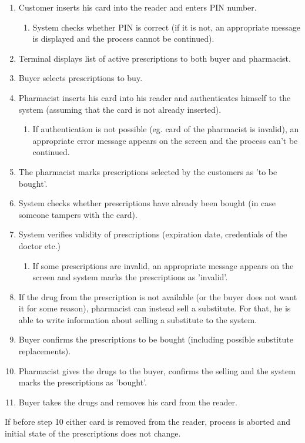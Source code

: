 \begin{enumerate}
  \item Customer inserts his card into the reader and enters PIN number.
  \begin{enumerate}
	\item System checks whether PIN is correct (if it is not, an appropriate message is displayed and the process cannot be continued).
  \end{enumerate}
  \item Terminal displays list of active prescriptions to both buyer and pharmacist.
  \item Buyer selects prescriptions to buy.
  \item Pharmacist inserts his card into his reader and authenticates himself to the system (assuming that the card is not already inserted).
  \begin{enumerate}
	\item  If authentication is not possible (eg. card of the pharmacist is invalid), an appropriate error message appears on the screen and the process can't be continued.
  \end{enumerate}
  \item The pharmacist marks prescriptions selected by the customers as 'to be bought'.
  \item System checks whether prescriptions have already been bought (in case someone tampers with the card).
  \item System verifies validity of prescriptions (expiration date, credentials of the doctor etc.)
 \begin{enumerate}
	\item If some prescriptions are invalid, an appropriate message appears on the screen and system marks the prescriptions as 'invalid'.
  \end{enumerate}
  \item  If the drug from the prescription is not available (or the buyer does not want it for some reason), pharmacist can instead sell a substitute. For that, he is able to write information about selling a substitute to the system.
  \item Buyer confirms the prescriptions to be bought (including possible substitute replacements).
  \item Pharmacist gives the drugs to the buyer, confirms the selling and the system marks the prescriptions as 'bought'.
  \item  Buyer takes the drugs and removes his card from the reader.
\end{enumerate}

 If before step 10 either card is removed from the reader, process is aborted and initial state of the prescriptions does not change.

